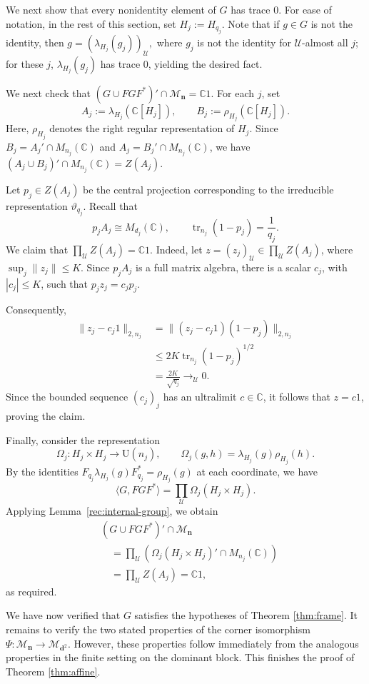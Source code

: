 \documentclass[12pt]{amsart}
\numberwithin{equation}{section}
\theoremstyle{definition}
\newcommand{\C}{\mathbb{C}}
\def\cal{\mathcal}
\def\M{\mathcal{M}}
\DeclareMathOperator{\tr}{tr}
\newcommand\cU{{\cal U}}
\def \u{\mathcal U}
\def \M{\mathcal{M}}
\begin{document}
We next show that every nonidentity element of $G$ has trace $0$.  For ease of notation, in the rest of this section, set $H_j:=H_{q_j}$.  Note that if $g\in G$ is not the identity, then $g=(\lambda_{H_j}(g_j))_\cU,$ where $g_j$ is not the identity for $\u$-almost all $j$; for these $j$, $\lambda_{H_j}(g_j)$ has trace $0$, yielding the desired fact.

We next check that $(G\cup FGF^*)'\cap\M_{\mathbf n}=\C1$.
For each $j$, set
\[
A_j:=\lambda_{H_j}(\C[H_j]),
\qquad
B_j:=\rho_{H_j}(\C[H_j]).
\]
Here, $\rho_{H_j}$ denotes the right regular representation of $H_j$.
Since $B_j=A_j'\cap M_{n_j}(\C)$ and
$A_j=B_j'\cap M_{n_j}(\C)$, we have $
(A_j\cup B_j)'\cap M_{n_j}(\C)=Z(A_j).$

Let $p_j\in Z(A_j)$ be the central projection
corresponding to the irreducible representation
$\vartheta_{q_j}$. Recall that
\[
p_jA_j\cong M_{d_j}(\C),
\qquad
\tr_{n_j}(1-p_j)=\frac1{q_j}.
\]
We claim that $\prod_{\mathcal U}Z(A_j)=\C1$. 
Indeed, let 
$z=(z_j)_{\mathcal U}\in\prod_{\mathcal U}Z(A_j)$,
where $\sup_j\|z_j\|\le K$.
Since $p_jA_j$ is a full matrix algebra,
there is a scalar $c_j$, with $|c_j|\le K$,
such that $p_jz_j=c_jp_j$.

Consequently,
\[
\begin{aligned}
\|z_j-c_j1\|_{2,n_j}
&=\|(z_j-c_j1)(1-p_j)\|_{2,n_j}\\
&\le 2K\tr_{n_j}(1-p_j)^{1/2}\\
&=\frac{2K}{\sqrt{q_j}}
\longrightarrow_{\mathcal U}0.
\end{aligned}
\]
Since the bounded sequence $(c_j)_j$ has an
ultralimit $c\in\C$, it follows that
$z=c1$, proving the claim.

Finally, consider the representation
\[
\Omega_j:H_j\times H_j\to\mathrm U(n_j),
\qquad
\Omega_j(g,h)=\lambda_{H_j}(g)\rho_{H_j}(h).
\]
By the identities
$F_{q_j}\lambda_{H_j}(g)F_{q_j}^*=\rho_{H_j}(g)$
at each coordinate, we have
\[
\langle G,FGF^*\rangle
=\prod_{\mathcal U}\Omega_j(H_j\times H_j).
\]
Applying Lemma~\ref{rec:internal-group},
we obtain
\[
\begin{aligned}
&(G\cup FGF^*)'\cap\M_{\mathbf n}\\
&\quad=
\prod_{\mathcal U}
\left(
\Omega_j(H_j\times H_j)'
\cap M_{n_j}(\C)
\right)\\
&\quad=\prod_{\mathcal U}Z(A_j)
=\C1,
\end{aligned}
\]
as required.


We have now verified that $G$ satisfies the hypotheses of Theorem \ref{thm:frame}.  It remains to verify the two stated properties of the corner isomorphism $\Psi:\M_{\mathbf{n}}\to \M_{\mathbf{d}^2}$.  However, these properties follow immediately from the analogous properties in the finite setting on the dominant block.  This finishes the proof of Theorem \ref{thm:affine}.
\end{document}
